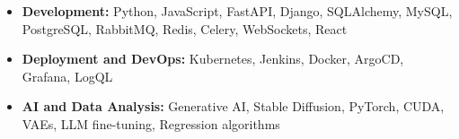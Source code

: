 
\begin{cvskills}

\setlength{\leftmargini}{1em}
\begin{itemize}
    \item \textbf{Development:} Python, JavaScript, FastAPI, Django, SQLAlchemy, MySQL, PostgreSQL, RabbitMQ, Redis, Celery, WebSockets, React
    \item \textbf{Deployment and DevOps:} Kubernetes, Jenkins, Docker, ArgoCD, Grafana, LogQL
    \item \textbf{AI and Data Analysis:} Generative AI, Stable Diffusion, PyTorch, CUDA, VAEs, LLM fine-tuning, Regression algorithms
\end{itemize}

\end{cvskills}
